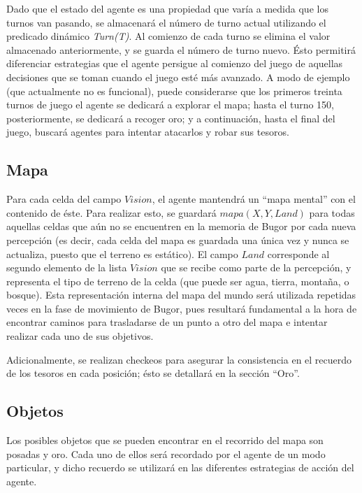 \documentclass[a4paper,10pt,spanish]{article}
\begin{document}
	Dado que el estado del agente es una propiedad que var\'ia a medida que los turnos van pasando, se almacenar\'a el n\'umero de turno actual utilizando el predicado din\'amico \emph{Turn(T)}. Al comienzo de cada turno se elimina el valor almacenado anteriormente, y se guarda el n\'umero de turno nuevo. \'Esto permitir\'a diferenciar estrategias que el agente persigue al comienzo del juego de aquellas decisiones que se toman cuando el juego est\'e m\'as avanzado. A modo de ejemplo (que actualmente no es funcional), puede considerarse que los primeros treinta turnos de juego el agente se dedicar\'a a explorar el mapa; hasta el turno 150, posteriormente, se dedicar\'a a recoger oro; y a continuaci\'on, hasta el final del juego, buscar\'a agentes para intentar atacarlos y robar sus tesoros.
	
	\subsection{Mapa}
	
	Para cada celda del campo $Vision$, el agente mantendr\'a un ``mapa mental'' con el contenido de \'este. Para realizar esto, se guardar\'a $mapa(X, Y, Land)$ para todas aquellas celdas que a\'un no se encuentren en la memoria de Bugor por cada nueva percepci\'on (es decir, cada celda del mapa es guardada una \'unica vez y nunca se actualiza, puesto que el terreno es est\'atico). El campo $Land$ corresponde al segundo elemento de la lista $Vision$ que se recibe como parte de la percepci\'on, y representa el tipo de terreno de la celda (que puede ser agua, tierra, monta\~na, o bosque). Esta representaci\'on interna del mapa del mundo ser\'a utilizada repetidas veces en la fase de movimiento de Bugor, pues resultar\'a fundamental a la hora de encontrar caminos para trasladarse de un punto a otro del mapa e intentar realizar cada uno de sus objetivos.
	
	Adicionalmente, se realizan checkeos para asegurar la consistencia en el recuerdo de los tesoros en cada posici\'on; \'esto se detallar\'a en la secci\'on ``Oro''.

	\subsection{Objetos}
	
	Los posibles objetos que se pueden encontrar en el recorrido del mapa son posadas y oro. Cada uno de ellos ser\'a recordado por el agente de un modo particular, y dicho recuerdo se utilizar\'a en las diferentes estrategias de acci\'on del agente.
	
\end{document}
